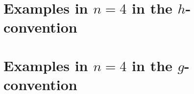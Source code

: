 \documentclass[11pt]{article}%
\theoremstyle{definition}\newtheorem{definition}{Definition}[section]
\theoremstyle{definition}\newtheorem{remark}[definition]{Remark}
\theoremstyle{remark}
\numberwithin{equation}{section}
\begin{document}
\section{Examples in $n=4$ in the $h$-convention}



\newpage
\section{Examples in $n=4$ in the $g$-convention}




\end{document}
